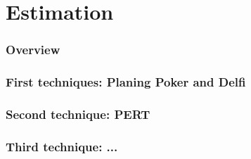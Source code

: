 \part{Estimation}
\section{Overview}
\section{First techniques: Planing Poker and Delfi}
\section{Second technique: PERT}
\section{Third technique: ...}